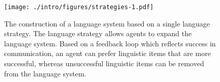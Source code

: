 \begin{figure}
  \begin{center}
    \texttt{[image: ./intro/figures/strategies-1.pdf]}
    \caption[The construction of a language system based on a single
    language strategy]{The construction of a language system based on
      a single language strategy. The language strategy allows agents
      to expand the language system. Based on a feedback loop which
      reflects success in communication, an agent can prefer linguistic
      items that are more successful, whereas unsuccessful linguistic items
      can be removed from the language system.}
    \label{f:strategies-1}
  \end{center}
\end{figure}

\addtocounter{chapter}{-1}

\thispagestyle{empty}








